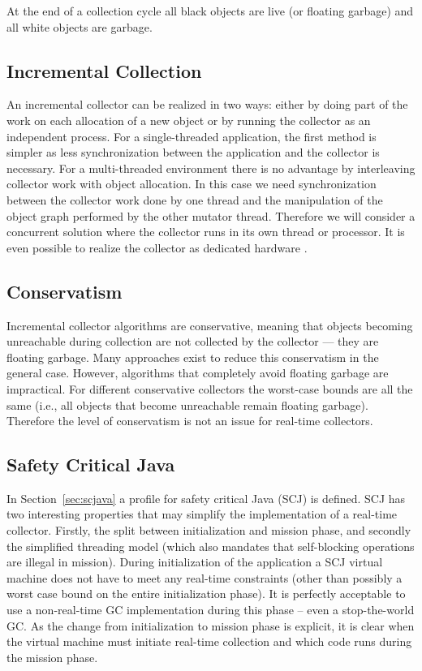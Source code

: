At the end of a collection cycle all black objects are live (or
floating garbage) and all white objects are garbage.

\subsection{Incremental Collection}

An incremental collector can be realized in two ways: either by doing
part of the work on each allocation of a new object or by running the
collector as an independent process. For a single-threaded
application, the first method is simpler as less synchronization
between the application and the collector is necessary. For a
multi-threaded environment there is no advantage by interleaving
collector work with object allocation. In this case we need
synchronization between the collector work done by one thread and the
manipulation of the object graph performed by the other mutator
thread. Therefore we will consider a concurrent solution where the
collector runs in its own thread or processor. It is even possible to
realize the collector as dedicated hardware \cite{gc:flavius}.

\subsection{Conservatism}

Incremental collector algorithms are conservative, meaning that
objects becoming unreachable during collection are not collected by
the collector --- they are floating garbage. Many approaches exist
to reduce this conservatism in the general case. However, algorithms
that completely avoid floating garbage are impractical. For
different conservative collectors the worst-case bounds are all the
same (i.e., all objects that become unreachable remain floating
garbage). Therefore the level of conservatism is not an issue for
real-time collectors.

\subsection{Safety Critical Java}

In Section~\ref{sec:scjava} a profile for safety critical Java (SCJ)
is defined. SCJ has two interesting properties that may simplify the
implementation of a real-time collector. Firstly, the split between
initialization and mission phase, and secondly the simplified
threading model (which also mandates that self-blocking operations
are illegal in mission).  During initialization of the application a
SCJ virtual machine does not have to meet any real-time constraints
(other than possibly a worst case bound on the entire initialization
phase). It is perfectly acceptable to use a non-real-time GC
implementation during this phase -- even a stop-the-world GC. As the
change from initialization to mission phase is explicit, it is clear
when the virtual machine must initiate real-time collection and
which code runs during the mission phase.


